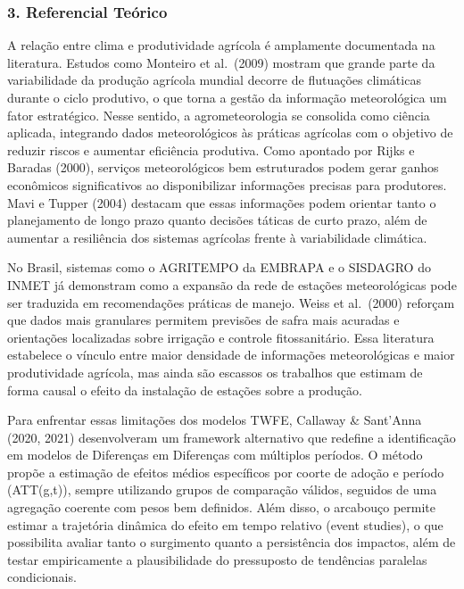 \documentclass[
  brazilian,
  12pt,
  a4paper,
]{article}
\begin{document}
\subsubsection{\texorpdfstring{\textbf{3. Referencial
Teórico}}{3. Referencial Teórico}}\label{referencial-teuxf3rico}

A relação entre clima e produtividade agrícola é amplamente documentada
na literatura. Estudos como Monteiro et al.~(2009) mostram que grande
parte da variabilidade da produção agrícola mundial decorre de
flutuações climáticas durante o ciclo produtivo, o que torna a gestão da
informação meteorológica um fator estratégico. Nesse sentido, a
agrometeorologia se consolida como ciência aplicada, integrando dados
meteorológicos às práticas agrícolas com o objetivo de reduzir riscos e
aumentar eficiência produtiva. Como apontado por Rijks e Baradas (2000),
serviços meteorológicos bem estruturados podem gerar ganhos econômicos
significativos ao disponibilizar informações precisas para produtores.
Mavi e Tupper (2004) destacam que essas informações podem orientar tanto
o planejamento de longo prazo quanto decisões táticas de curto prazo,
além de aumentar a resiliência dos sistemas agrícolas frente à
variabilidade climática.

No Brasil, sistemas como o AGRITEMPO da EMBRAPA e o SISDAGRO do INMET já
demonstram como a expansão da rede de estações meteorológicas pode ser
traduzida em recomendações práticas de manejo. Weiss et al.~(2000)
reforçam que dados mais granulares permitem previsões de safra mais
acuradas e orientações localizadas sobre irrigação e controle
fitossanitário. Essa literatura estabelece o vínculo entre maior
densidade de informações meteorológicas e maior produtividade agrícola,
mas ainda são escassos os trabalhos que estimam de forma causal o efeito
da instalação de estações sobre a produção.

Para enfrentar essas limitações dos modelos TWFE, Callaway \& Sant'Anna
(2020, 2021) desenvolveram um framework alternativo que redefine a
identificação em modelos de Diferenças em Diferenças com múltiplos
períodos. O método propõe a estimação de efeitos médios específicos por
coorte de adoção e período (ATT(g,t)), sempre utilizando grupos de
comparação válidos, seguidos de uma agregação coerente com pesos bem
definidos. Além disso, o arcabouço permite estimar a trajetória dinâmica
do efeito em tempo relativo (event studies), o que possibilita avaliar
tanto o surgimento quanto a persistência dos impactos, além de testar
empiricamente a plausibilidade do pressuposto de tendências paralelas
condicionais.
\end{document}
